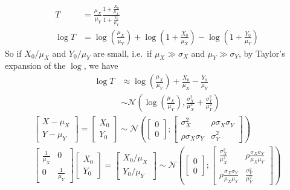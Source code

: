 \documentclass[../../Main_ManuscritThese.tex]{subfiles}
\begin{document}
  \begin{align}
    T &= \frac{\mu_X}{\mu_Y}\frac{1 + \frac{X_0}{\mu_X}}{1 + \frac{Y_0}{\mu_Y}} \\
    \log T &= \log\left(\frac{\mu_X}{\mu_Y}\right) + \log\left(1 + \frac{X_0}{\mu_X}\right) -\log\left(1 + \frac{Y_0}{\mu_Y}\right)
  \end{align}
  So if $X_0 / \mu_X$ and $Y_0/ \mu_Y$ are small, i.e.\ if $\mu_X \gg \sigma_X$ and $\mu_Y \gg \sigma_Y$, by Taylor's expansion of the $\log$, we have
  \begin{align}
    \log T & \approx \log\left(\frac{\mu_X}{\mu_Y}\right) + \frac{X_0}{\mu_X} - \frac{Y_0}{\mu_Y}
\\
    & \sim \mathcal{N}\left(\log\left(\frac{\mu_X}{\mu_Y}\right), \frac{\sigma_X^2}{\mu_X^2}+\frac{\sigma_Y^2}{\mu_Y^2}\right)
  \end{align}
  \begin{align}
    \begin{bmatrix}
      X - \mu_X \\ Y - \mu_Y
    \end{bmatrix} = 
    \begin{bmatrix}
      X_0 \\ Y_0
    \end{bmatrix} \sim \mathcal{N}\left(%
    \begin{bmatrix}
      0 \\ 0
    \end{bmatrix};%
    \begin{bmatrix}
      \sigma^2_X  & \rho \sigma_X \sigma_Y \\
      \rho\sigma_X \sigma_Y & \sigma^2_Y
    \end{bmatrix} \right)%
    \\
    \begin{bmatrix}
      \frac{1}{\mu_X} & 0 \\
      0 & \frac{1}{\mu_Y}
    \end{bmatrix}
    \begin{bmatrix}
      X_0 \\ Y_0
    \end{bmatrix}=
    \begin{bmatrix}
      X_0/\mu_X \\ Y_0/ \mu_Y
    \end{bmatrix} \sim \mathcal{N}\left(%
    \begin{bmatrix}
      0 \\ 0
    \end{bmatrix};%
    \begin{bmatrix}
      \frac{\sigma^2_X}{\mu_X^2}  & \rho \frac{\sigma_X \sigma_Y}{\mu_X \mu_Y} \\
      \rho \frac{\sigma_X \sigma_Y}{\mu_X \mu_Y}& \frac{\sigma^2_Y}{\mu_Y^2}
    \end{bmatrix} \right)%
  \end{align}
\end{document}
